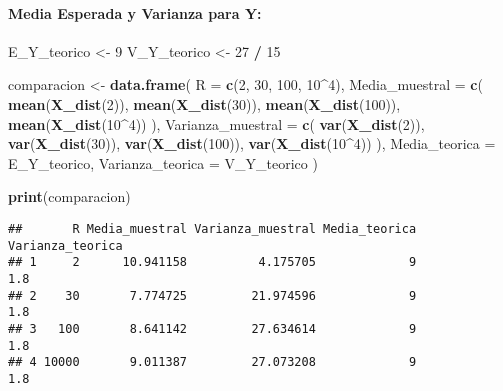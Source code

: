 \documentclass[
]{article}
\newenvironment{Shaded}{\begin{snugshade}}{\end{snugshade}}
\newcommand{\AttributeTok}[1]{\textcolor[rgb]{0.13,0.29,0.53}{#1}}
\newcommand{\DecValTok}[1]{\textcolor[rgb]{0.00,0.00,0.81}{#1}}
\newcommand{\FunctionTok}[1]{\textcolor[rgb]{0.13,0.29,0.53}{\textbf{#1}}}
\newcommand{\NormalTok}[1]{#1}
\newcommand{\OtherTok}[1]{\textcolor[rgb]{0.56,0.35,0.01}{#1}}
\newcommand{\SpecialCharTok}[1]{\textcolor[rgb]{0.81,0.36,0.00}{\textbf{#1}}}
\begin{document}
\paragraph{Media Esperada y Varianza para
Y:}\label{media-esperada-y-varianza-para-y}

\begin{Shaded}
\begin{Highlighting}[]
\NormalTok{E\_Y\_teorico }\OtherTok{\textless{}{-}} \DecValTok{9}
\NormalTok{V\_Y\_teorico }\OtherTok{\textless{}{-}} \DecValTok{27} \SpecialCharTok{/} \DecValTok{15}

\NormalTok{comparacion }\OtherTok{\textless{}{-}} \FunctionTok{data.frame}\NormalTok{(}
  \AttributeTok{R =} \FunctionTok{c}\NormalTok{(}\DecValTok{2}\NormalTok{, }\DecValTok{30}\NormalTok{, }\DecValTok{100}\NormalTok{, }\DecValTok{10}\SpecialCharTok{\^{}}\DecValTok{4}\NormalTok{), }
    \AttributeTok{Media\_muestral =} \FunctionTok{c}\NormalTok{(}
    \FunctionTok{mean}\NormalTok{(}\FunctionTok{X\_dist}\NormalTok{(}\DecValTok{2}\NormalTok{)),}
    \FunctionTok{mean}\NormalTok{(}\FunctionTok{X\_dist}\NormalTok{(}\DecValTok{30}\NormalTok{)),}
    \FunctionTok{mean}\NormalTok{(}\FunctionTok{X\_dist}\NormalTok{(}\DecValTok{100}\NormalTok{)),}
    \FunctionTok{mean}\NormalTok{(}\FunctionTok{X\_dist}\NormalTok{(}\DecValTok{10}\SpecialCharTok{\^{}}\DecValTok{4}\NormalTok{))}
\NormalTok{  ),}
  \AttributeTok{Varianza\_muestral =} \FunctionTok{c}\NormalTok{(}
    \FunctionTok{var}\NormalTok{(}\FunctionTok{X\_dist}\NormalTok{(}\DecValTok{2}\NormalTok{)),}
    \FunctionTok{var}\NormalTok{(}\FunctionTok{X\_dist}\NormalTok{(}\DecValTok{30}\NormalTok{)),}
    \FunctionTok{var}\NormalTok{(}\FunctionTok{X\_dist}\NormalTok{(}\DecValTok{100}\NormalTok{)),}
    \FunctionTok{var}\NormalTok{(}\FunctionTok{X\_dist}\NormalTok{(}\DecValTok{10}\SpecialCharTok{\^{}}\DecValTok{4}\NormalTok{))}
\NormalTok{  ),}
  \AttributeTok{Media\_teorica =}\NormalTok{ E\_Y\_teorico,}
  \AttributeTok{Varianza\_teorica =}\NormalTok{ V\_Y\_teorico}
\NormalTok{)}

\FunctionTok{print}\NormalTok{(comparacion)}
\end{Highlighting}
\end{Shaded}

\begin{verbatim}
##       R Media_muestral Varianza_muestral Media_teorica Varianza_teorica
## 1     2      10.941158          4.175705             9              1.8
## 2    30       7.774725         21.974596             9              1.8
## 3   100       8.641142         27.634614             9              1.8
## 4 10000       9.011387         27.073208             9              1.8
\end{verbatim}
\end{document}
